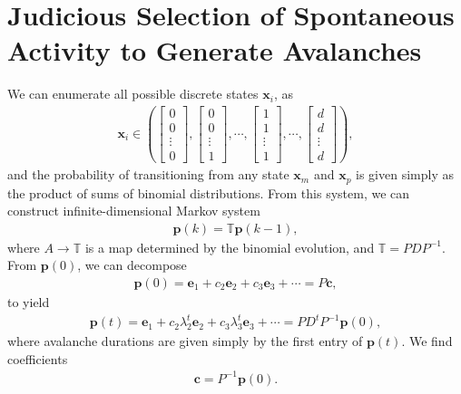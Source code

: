 \documentclass[superscriptaddress]{revtex4-1}
\begin{document}
\section{Judicious Selection of Spontaneous Activity to Generate Avalanches}
We can enumerate all possible discrete states $\bm{x}_i$, as
\begin{align*}
\bm{x}_i \in 
\left( 
\begin{bmatrix}
0 \\ 0 \\ \vdots \\ 0
\end{bmatrix},
\begin{bmatrix}
0 \\ 0 \\ \vdots \\ 1
\end{bmatrix},
\dotsm,
\begin{bmatrix}
1 \\ 1 \\ \vdots \\ 1
\end{bmatrix},
\dotsm,
\begin{bmatrix}
d \\ d \\ \vdots \\ d
\end{bmatrix}
\right),
\end{align*}
and the probability of transitioning from any state $\bm{x}_m$ and $\bm{x}_p$ is given simply as the product of sums of binomial distributions. From this system, we can construct infinite-dimensional Markov system
\begin{align*}
\bm{p}(k) = \mathbb{T}\bm{p}(k-1),
\end{align*}
where $A \rightarrow \mathbb{T}$ is a map determined by the binomial evolution, and $\mathbb{T} = PDP^{-1}$. From $\bm{p}(0)$, we can decompose
\begin{align*}
\bm{p}(0) = \bm{e}_1 + c_2\bm{e}_2 + c_3\bm{e}_3 + \dotsm = P\bm{c},
\end{align*}
to yield
\begin{align*}
\bm{p}(t) = \bm{e}_1 + c_2\lambda_2^t\bm{e}_2 + c_3\lambda_3^t\bm{e}_3 + \dotsm = PD^tP^{-1}\bm{p}(0),
\end{align*}
where avalanche durations are given simply by the first entry of $\bm{p}(t)$. We find coefficients
\begin{align*}
\bm{c} = P^{-1}\bm{p}(0). 
\end{align*}
\end{document}
